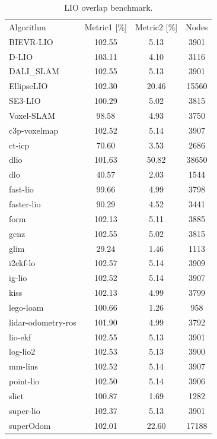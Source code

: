 \begin{table}[]
\centering
\begin{tabular}{lccc}
\rowcolor[HTML]{C0C0C0}
Algorithm & Metric1 [\%] & Metric2 [\%] & Nodes \\
BIEVR-LIO & 102.55 & 5.13 & 3901 \\
D-LIO & 103.11 & 4.10 & 3116 \\
DALI_SLAM & 102.55 & 5.13 & 3901 \\
EllipseLIO & 102.30 & 20.46 & 15560 \\
SE3-LIO & 100.29 & 5.02 & 3815 \\
Voxel-SLAM & 98.58 & 4.93 & 3750 \\
c3p-voxelmap & 102.52 & 5.14 & 3907 \\
ct-icp & 70.60 & 3.53 & 2686 \\
dlio & 101.63 & 50.82 & 38650 \\
dlo & 40.57 & 2.03 & 1544 \\
fast-lio & 99.66 & 4.99 & 3798 \\
faster-lio & 90.29 & 4.52 & 3441 \\
form & 102.13 & 5.11 & 3885 \\
genz & 102.55 & 5.02 & 3815 \\
glim & 29.24 & 1.46 & 1113 \\
i2ekf-lo & 102.57 & 5.14 & 3909 \\
ig-lio & 102.52 & 5.14 & 3907 \\
kiss & 102.13 & 4.99 & 3799 \\
lego-loam & 100.66 & 1.26 & 958 \\
lidar-odometry-ros & 101.90 & 4.99 & 3792 \\
lio-ekf & 102.55 & 5.13 & 3901 \\
log-lio2 & 102.53 & 5.13 & 3900 \\
mm-lins & 102.52 & 5.14 & 3907 \\
point-lio & 102.50 & 5.14 & 3906 \\
slict & 100.87 & 1.69 & 1282 \\
super-lio & 102.37 & 5.13 & 3901 \\
superOdom & 102.01 & 22.60 & 17188 \\
\end{tabular}
\caption{LIO overlap benchmark.}
\label{tab:lio_overlap}
\end{table}